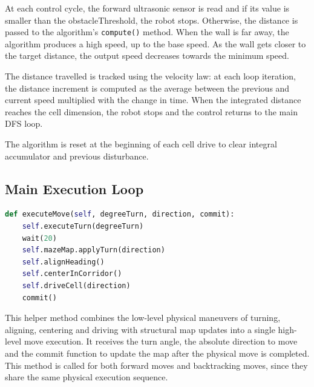 At each control cycle, the forward ultrasonic sensor is read and if its value is smaller than the obstacleThreshold, the robot stops. Otherwise, the distance is passed to the algorithm’s \texttt{compute()} method. When the wall is far away, the algorithm produces a high speed, up to the base speed. As the wall gets closer to the target distance, the output speed decreases towards the minimum speed. 

The distance travelled is tracked using the velocity law: at each loop iteration, the distance increment is computed as the average between the previous and current speed multiplied with the change in time. When the integrated distance reaches the cell dimension, the robot stops and the control returns to the main DFS loop. 

The algorithm is reset at the beginning of each cell drive to clear integral accumulator and previous disturbance.

\subsection{Main Execution Loop}

\begin{lstlisting}[language=Python, caption={MazeSolverController move executing}, label={lst:lk-init}]
def executeMove(self, degreeTurn, direction, commit):
    self.executeTurn(degreeTurn)
    wait(20)
    self.mazeMap.applyTurn(direction)
    self.alignHeading()
    self.centerInCorridor()
    self.driveCell(direction)
    commit()
\end{lstlisting}

This helper method combines the low-level physical maneuvers of turning, aligning, centering and driving with structural map updates into a single high-level move execution. It receives the turn angle, the absolute direction to move and the commit function to update the map after the physical move is completed. This method is called for both forward moves and backtracking moves, since they share the same physical execution sequence.

